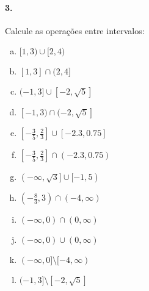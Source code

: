 \documentclass[a4paper,twocolumn,12pt]{article}
\begin{document}
\paragraph*{3. } Calcule as operações entre intervalos:
\begin{enumerate}[a)]
\item $[1, 3) \cup [2, 4)$
\item $[1, 3] \cap (2, 4]$
\item $(-1, 3] \cup  [-2, \sqrt{5}]$
\item $[-1, 3) \cap  (-2, \sqrt{5}]$
\item $\left[-\frac{3}{5},\frac{2}{3}\right] \cup [-2.3,0.75]$
\item $\left[-\frac{3}{5},\frac{2}{3}\right] \cap (-2.3,0.75)$
\item $(-\infty, \sqrt{3}] \cup [-1, 5)$
\item $\left(-\frac{8}{3},3\right)\cap (-4,\infty)$
\item $(-\infty, 0) \cap (0, \infty)$
\item $(-\infty, 0) \cup (0, \infty)$
\item $(-\infty, 0] \setminus [-4, \infty)$
\item $(-1, 3] \setminus  [-2, \sqrt{5}]$
\end{enumerate}

 
\end{document}
